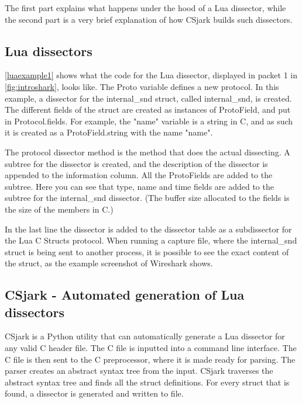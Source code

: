The first part explains what happens under the hood of a Lua dissector, while 
the second part is a very brief explanation of how CSjark builds such dissectors.

\subsection{Lua dissectors}

\autoref{luaexample1} shows what the code for the Lua dissector, displayed in packet 1 in \autoref{fig:introshark}, looks like.
The Proto variable defines a new protocol. In this example, a dissector for the internal\_snd struct, called internal\_snd, is created. 
The different fields of the struct are created as instances of ProtoField, and put in Protocol.fields.
For example, the "name" variable is a string in C, and as such it is created as a ProtoField.string with the 
name "name".

The protocol dissector method is the method that does the actual dissecting.
A subtree for the dissector is created, and the description of the dissector is appended to the information column.
All the ProtoFields are added to the subtree. Here you can see that type, name and time fields are added to the subtree for the internal\_snd dissector.
(The buffer size allocated to the fields is the size of the members in C.)

In the last line the dissector is added to the dissector table as a subdissector for the Lua C Structs protocol.
When running a capture file, where the internal\_snd struct is being sent to another process, it is possible to see the exact content of the struct,
as the example screenshot of Wireshark shows.



\subsection{CSjark - Automated generation of Lua dissectors}
CSjark is a Python utility that can automatically generate a Lua dissector for 
any valid C header file. The C file is inputted into a command line interface.
The C file is then sent to the C preprocessor, where it is made ready for parsing.
The parser creates an abstract syntax tree from the input.
CSjark traverses the abstract syntax tree and finds all the struct definitions.
For every struct that is found, a dissector is generated and written to file.






